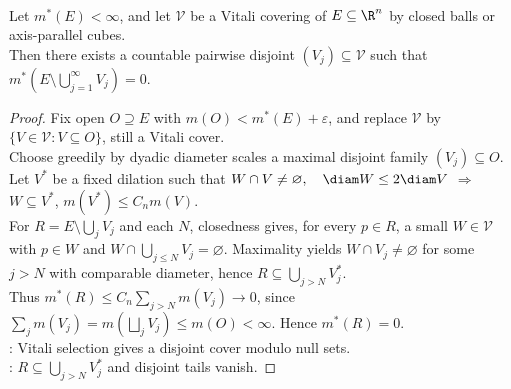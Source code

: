 \begin{theorem} \label{thm:vitali-covering-lemma-balls-cubes} \\
Let $m^\ast(E)<\infty$, and let $\mathcal{V}$ be a Vitali covering of $E\subseteq\R^n$ by closed balls or axis-parallel cubes.\\
Then there exists a countable pairwise disjoint $(V_j)\subseteq\mathcal{V}$ such that $m^\ast\left(E\setminus\bigcup\limits_{j=1}^\infty V_j\right)=0$.
\begin{proof}
Fix open $O\supseteq E$ with $m(O)<m^\ast(E)+\varepsilon$, and replace $\mathcal{V}$ by $\{V\in\mathcal{V}:V\subseteq O\}$, still a Vitali cover.\\
Choose greedily by dyadic diameter scales a maximal disjoint family $(V_j)\subseteq O$. Let $V^\ast$ be a fixed dilation such that $W\cap V\neq\varnothing,\quad \diam W\le 2\diam V$ $\Longrightarrow$ $W\subseteq V^\ast$, $m(V^\ast)\le C_n m(V)$.\\
For $R=E\setminus\bigcup_jV_j$ and each $N$, closedness gives, for every $p\in R$, a small $W\in\mathcal{V}$ with $p\in W$ and $W\cap\bigcup_{j\le N}V_j=\varnothing$. Maximality yields $W\cap V_j\neq\varnothing$ for some $j>N$ with comparable diameter, hence $R\subseteq \bigcup\limits_{j>N}V_j^\ast$.\\
Thus $m^\ast(R)\le C_n\sum\limits_{j>N}m(V_j)\to 0$, since $\sum_jm(V_j)=m(\bigsqcup_jV_j)\le m(O)<\infty$. Hence $m^\ast(R)=0$.\\
: Vitali selection gives a disjoint cover modulo null sets.\\
: $R\subseteq\bigcup_{j>N}V_j^\ast$ and disjoint tails vanish.
\end{proof}
\end{theorem}

